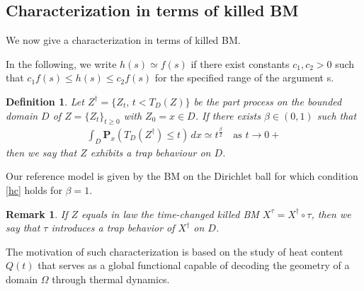 \documentclass[[11pt,a4paper,reqno]{article}
\newtheorem{definition}{Definition}
\newtheorem{remark}{Remark}[section]
\numberwithin{equation}{section}
\begin{document}
\subsection{Characterization in terms of killed BM}
We now give a characterization in terms of killed BM.

In the following,  we write $h(s) \simeq f(s)$ if there exist constants $c_1,c_2 > 0$ such that $c_1 f(s) \leq h(s) \leq c_2f (s)$ for the specified range of the argument s. 


\begin{definition}
Let $Z^\dagger =\{Z_t, \, t < T_D(Z)\}$ be the part process on the bounded domain $D$ of $Z= \{Z_t\}_{t \geq 0}$ with $Z_0=x \in D$. If there exists $\beta \in (0, 1)$ such that
\begin{align}\label{hc}
\int_{D} \mathbf{P}_x(T_D(Z^\dagger) \leq t) \, dx   \simeq   t^\frac{\beta}{2} \quad \textrm{as } t \to 0+ 
\end{align}
then we say that $Z$ exhibits a trap behaviour on $D$.
\label{defTraphc}
\end{definition}




Our reference model is given by the BM on the Dirichlet ball for which condition \eqref{hc} holds for $\beta=1$.


\begin{remark}\label{TAU}     If $Z$ equals in law the time-changed killed BM $X^\tau=X^\dagger \circ \tau$, then we say that $\tau$ introduces a trap behavior of $X^\dagger$ on $D$.
\end{remark}


The motivation of such characterization is based on the study of heat content
$Q(t)$  that serves as a global functional capable of decoding the geometry of a domain $\Omega$ through thermal dynamics. 
\end{document}
